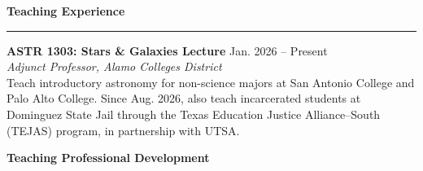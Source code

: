 \documentclass[12pt]{article}
\begin{document}

\noindent
{\bf Teaching Experience} \\
\vspace{-10mm}
\begin{center}
\rule{\textwidth}{0.2mm}
\end{center}
\vspace{-3mm}

\noindent
\textbf{ASTR 1303: Stars \& Galaxies Lecture}
\hfill Jan. 2026 -- Present \\
\textit{Adjunct Professor, Alamo Colleges District} \\
Teach introductory astronomy for non-science majors at
San Antonio College and Palo Alto College. Since Aug. 2026,
also teach incarcerated students at Dominguez State Jail
through the Texas Education Justice Alliance--South
(TEJAS) program, in partnership with UTSA. \\

\par\vspace{1mm}
\noindent\textbf{Teaching Professional Development}\par
\vspace{0mm}
\end{document}
